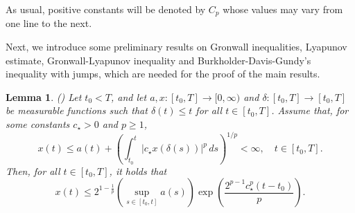 \documentclass[11pt]{article}
\theoremstyle{theorem}
\newtheorem{Lem}[Def]{Lemma}
\theoremstyle{definition}
\newcommand{\1}{{\bf 1}}
\begin{document}
As usual, positive constants will be denoted by $C_p$ whose values may vary from one line to the next.


Next, we introduce some preliminary results on  Gronwall inequalities, Lyapunov estimate, Gronwall-Lyapunov inequality and Burkholder-Davis-Gundy's inequality with jumps, which are needed for the proof of the main results.


\begin{Lem}
     (\cite[Corollary 2.2]{HN22})
\label{Cor2.1}
Let $t_0 < T$, and let $a, x : [t_0, T] \to [0,\infty)$ and
$\delta : [t_0, T] \to [t_0, T]$ be measurable functions such that
$\delta(t) \le t$ for all $t \in [t_0, T]$. Assume that, for some
constants $c_\star > 0$ and $p \ge 1$,
\[
x(t) \le a(t) + \left( \int_{t_0}^t |c_\star x(\delta(s))|^p \, ds \right)^{1/p}
< \infty, \quad t \in [t_0, T].
\]
Then, for all $t \in [t_0, T]$, it holds that
\[
x(t) \le 2^{1-\frac{1}{p}}
\left( \sup_{s \in [t_0, t]} a(s) \right)
\exp\left( \frac{2^{p-1} c_\star^p (t - t_0)}{p} \right).
\]
\end{Lem}
\end{document}
